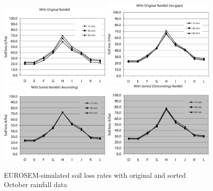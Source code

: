 \begin{figure}[htbp]
  \centering
    \includegraphics[width=0.49\textwidth]{./img/eurosem_soilloss_with_original}
    \includegraphics[width=0.49\textwidth]
{./img/eurosem_soilloss_with_original_nogap}\\[5mm]
    \includegraphics[width=0.49\textwidth]
{./img/eurosem_soilloss_with_sorted_asc}
    \includegraphics[width=0.49\textwidth]
{./img/eurosem_soilloss_with_sorted_des}
  \caption{EUROSEM-simulated soil loss rates with original and sorted October
rainfall data}
  \label{fig:eurosem_soilloss_results}
\end{figure}


